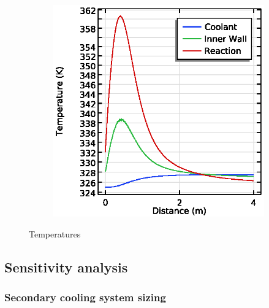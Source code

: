 \begin{figure}[h]
\begin{subfigure}{0.49\linewidth}
        \includegraphics[width=\linewidth]{figures/temperature-lines.eps}
        \caption{}
        \label{fig:comsol-temperature:lines}
    \end{subfigure}

    \caption{Temperatures}
    \label{fig:comsol-temperature}
\end{figure}

\subsection{Sensitivity analysis}

\subsubsection{Secondary cooling system sizing}

